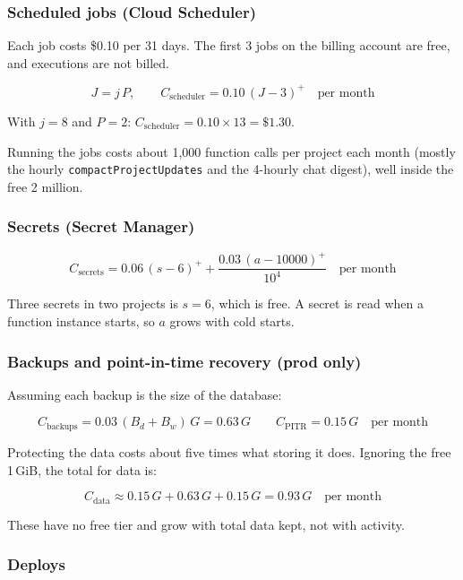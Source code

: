 \documentclass{article}
\newcommand{\pos}[1]{\left(#1\right)^{+}}
\begin{document}
\subsubsection{Scheduled jobs (Cloud Scheduler)}

Each job costs \$0.10 per 31 days. The first 3 jobs on the billing account are
free, and executions are not billed.

\[
J = j\,P, \qquad
C_{\text{scheduler}} = 0.10\,\pos{J - 3} \quad \text{per month}
\]

With $j = 8$ and $P = 2$: $C_{\text{scheduler}} = 0.10 \times 13 = \$1.30$.

Running the jobs costs about 1{,}000 function calls per project each month
(mostly the hourly \texttt{compactProjectUpdates} and the 4-hourly chat
digest), well inside the free 2 million.

\subsubsection{Secrets (Secret Manager)}

\[
C_{\text{secrets}} = 0.06\,\pos{s - 6}
                   + \frac{0.03\,\pos{a - 10000}}{10^{4}}
                   \quad \text{per month}
\]

Three secrets in two projects is $s = 6$, which is free. A secret is read when
a function instance starts, so $a$ grows with cold starts.

\subsubsection{Backups and point-in-time recovery (prod only)}

Assuming each backup is the size of the database:

\[
C_{\text{backups}} = 0.03\,(B_d + B_w)\,G = 0.63\,G
\qquad
C_{\text{PITR}} = 0.15\,G
\quad \text{per month}
\]

Protecting the data costs about five times what storing it does. Ignoring the
free 1\,GiB, the total for data is:

\[
C_{\text{data}} \approx 0.15\,G + 0.63\,G + 0.15\,G = 0.93\,G
\quad \text{per month}
\]

These have no free tier and grow with total data kept, not with activity.

\subsubsection{Deploys}
\end{document}
